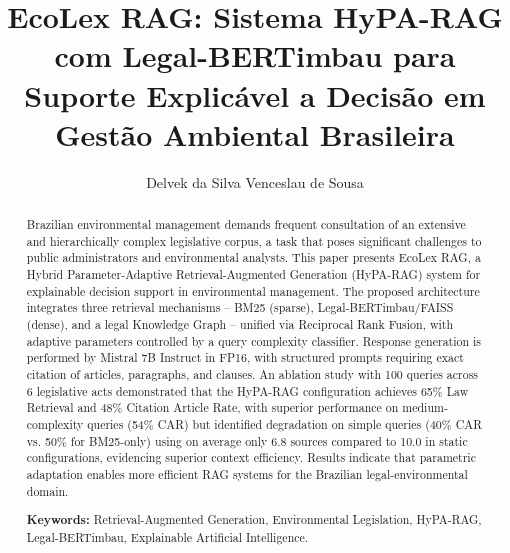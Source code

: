 \documentclass[12pt]{article}
\title{EcoLex RAG: Sistema HyPA-RAG com Legal-BERTimbau para\\ Suporte Explicável a Decisão em Gestão Ambiental Brasileira}
\author{Delvek da Silva Venceslau de Sousa\inst{1}}
\begin{document}
\maketitle

\begin{abstract}
Brazilian environmental management demands frequent consultation of an extensive and hierarchically complex legislative corpus, a task that poses significant challenges to public administrators and environmental analysts. This paper presents EcoLex RAG, a Hybrid Parameter-Adaptive Retrieval-Augmented Generation (HyPA-RAG) system for explainable decision support in environmental management. The proposed architecture integrates three retrieval mechanisms -- BM25 (sparse), Legal-BERTimbau/FAISS (dense), and a legal Knowledge Graph -- unified via Reciprocal Rank Fusion, with adaptive parameters controlled by a query complexity classifier. Response generation is performed by Mistral 7B Instruct in FP16, with structured prompts requiring exact citation of articles, paragraphs, and clauses. An ablation study with 100 queries across 6 legislative acts demonstrated that the HyPA-RAG configuration achieves 65\% Law Retrieval and 48\% Citation Article Rate, with superior performance on medium-complexity queries (54\% CAR) but identified degradation on simple queries (40\% CAR vs. 50\% for BM25-only) using on average only 6.8 sources compared to 10.0 in static configurations, evidencing superior context efficiency. Results indicate that parametric adaptation enables more efficient RAG systems for the Brazilian legal-environmental domain.

\textbf{Keywords:} Retrieval-Augmented Generation, Environmental Legislation, HyPA-RAG, Legal-BERTimbau, Explainable Artificial Intelligence.
\end{abstract}
\end{document}
